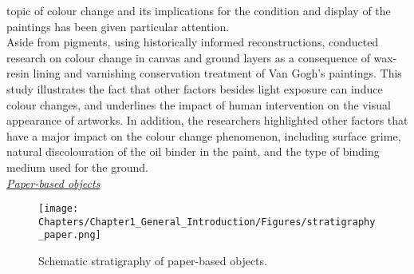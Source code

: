 topic of colour change and its implications for the condition and display of the paintings has been given particular attention. \\

Aside from pigments, using historically informed reconstructions, \citet{nieder_colour_2011} conducted research on colour change in canvas and ground layers as a consequence of wax-resin lining and varnishing conservation treatment of Van Gogh’s paintings. This study illustrates the fact that other factors besides light exposure can induce colour changes, and underlines the impact of human intervention on the visual appearance of artworks. In addition, the researchers highlighted other factors that have a major impact on the colour change phenomenon, including surface grime, natural discolouration of the oil binder in the paint, and the type of binding medium used for the ground. \\


\textit{\underline{Paper-based objects}}

\vspace{0.5cm}

\begin{figure*}[!h]
\centering
\texttt{[image: Chapters/Chapter1\_General\_Introduction/Figures/stratigraphy\_paper.png]}
\caption[\hspace{0.3cm}Schematic stratigraphy of paper-based objects]{Schematic stratigraphy of paper-based objects.}
\label{fig:paper_stratigraphy}
\end{figure*}


